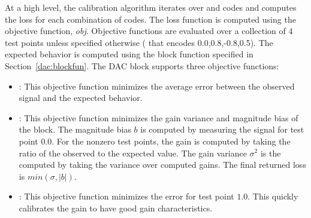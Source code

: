At a high level, the calibration algorithm iterates over  and
 codes and computes the loss for each combination of codes. The
loss function is computed using the objective function, \textit{obj}. Objective
functions are evaluated over a collection of 4
test points unless specified otherwise ( that encodes
0.0,0.8,-0.8,0.5). The expected behavior is computed using the block function
specified in Section~\ref{dac:blockfun}. The DAC block supports three objective functions:
\begin{itemize}
\item{}: This objective function minimizes the average
  error between the observed signal and the expected behavior. 
\item{}: This objective function minimizes the gain
  variance and magnitude bias of the block. The magnitude bias $b$ is computed
  by measuring the signal for test point $0.0$. For the nonzero test
  points, the gain is computed by taking the ratio of the observed to the
  expected value. The gain variance $\sigma^2$ is the computed by taking the
  variance over computed gains. The final returned loss is $min(\sigma,|b|)$.
  \item{}: This objective function minimizes the error for test
    point $1.0$. This quickly calibrates the gain to have good gain characteristics.
\end{itemize}
